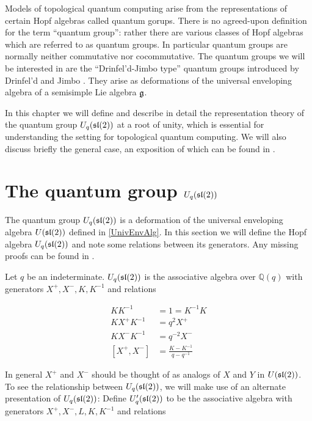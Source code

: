 Models of topological quantum computing arise from the representations of
certain Hopf algebras called quantum gorups. There is no agreed-upon definition
for the term ``quantum group'': rather there are various classes of Hopf
algebras which are referred to as quantum groups. In particular quantum groups
are normally neither commutative nor cocommutative. The quantum groups we will
be interested in are the ``Drinfel'd-Jimbo type'' quantum groups introduced by
Drinfel'd and Jimbo . They arise as deformations of the
universal enveloping algebra of a semisimple Lie algebra $\mathfrak{g}$.

In this chapter we will define and describe in detail the representation theory
of the quantum group $U_q(\mathfrak{sl}(2))$ at a root of unity, which is essential for
understanding the setting for topological quantum computing. We will also
discuss briefly the general case, an exposition of which can be found in
\cite{CP}.

\section{The quantum group $U_q(\mathfrak{sl}(2))$}
\label{UqSL2}


The quantum group $U_q(\mathfrak{sl}(2))$ is a deformation of the universal enveloping
algebra $U(\mathfrak{sl}(2))$ defined in \ref{UnivEnvAlg}.  In this section we will
define the Hopf algebra $U_q(\mathfrak{sl}(2))$ and note some relations between its
generators.  Any missing proofs can be found in \cite{Kassel1994}. 


\begin{defn}
\label{Uqsl2Def}
Let $q$ be an indeterminate. $U_q(\mathfrak{sl}(2))$ is the associative algebra over
$\mathbb{Q}(q)$ with generators $X^+,X^-,K, K^{-1}$ and relations 

\begin{align}
    KK^{-1} &= 1 = K^{-1}K \\
    K X^+ K^{-1} &= q^2  X^+  \\
    KX^-K^{-1} &= q^{-2} X^- \\
    [ X^+ ,X^-] &= \frac{K - K^{-1}}{q - q^{-1}}
\end{align}
\end{defn}

In general $ X^+ $ and $X^-$ should be thought of as analogs of $X$ and $Y$ in
$U(\mathfrak{sl}(2))$. To see the relationship between $U_q(\mathfrak{sl}(2))$, we will make use
of an alternate presentation of $U_q(\mathfrak{sl}(2))$: Define $U'_q(\mathfrak{sl}(2))$ to be
the associative algebra with generators $ X^+ ,X^-,L,K,K^{-1}$ and relations

